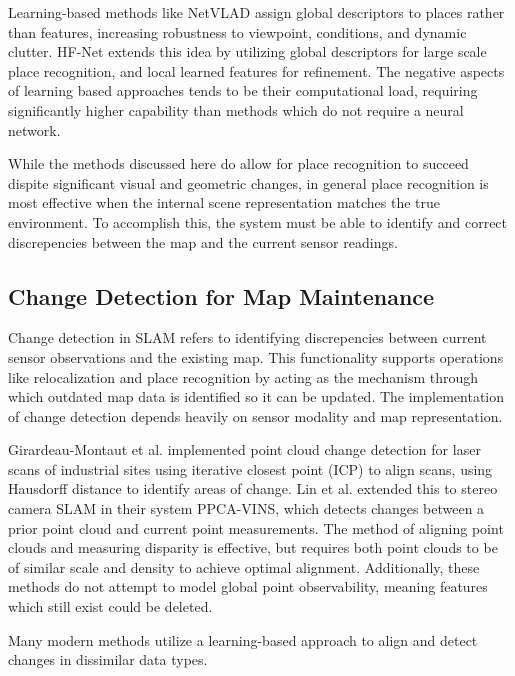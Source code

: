 Learning-based methods like NetVLAD \cite{arandjelovicNetVLADCNNArchitecture2016} assign global descriptors to places rather than features, increasing robustness to viewpoint, conditions, and dynamic clutter. HF-Net \cite{sarlinCoarseFineRobust2019} extends this idea by utilizing global descriptors for large scale place recognition, and local learned features for refinement. The negative aspects of learning based approaches tends to be their computational load, requiring significantly higher capability than methods which do not require a neural network.

While the methods discussed here do allow for place recognition to succeed dispite significant visual and geometric changes, in general place recognition is most effective when the internal scene representation matches the true environment. To accomplish this, the system must be able to identify and correct discrepencies between the map and the current sensor readings.

\subsection{Change Detection for Map Maintenance}

Change detection in SLAM refers to identifying discrepencies between current sensor observations and the existing map. This functionality supports operations like relocalization and place recognition by acting as the mechanism through which outdated map data is identified so it can be updated. The implementation of change detection depends heavily on sensor modality and map representation.

Girardeau-Montaut et al. \cite{girardeau-montautCHANGEDETECTIONPOINTS2005} implemented point cloud change detection for laser scans of industrial sites using iterative closest point (ICP) \cite{arunLeastSquaresFittingTwo1987}
\cite{beslMethodRegistration3D1992} to align scans, using Hausdorff distance \cite{aspertMESHMeasuringErrors2002} to identify areas of change. Lin et al. \cite{linPointCloudChange2022} extended this to stereo camera SLAM in their system PPCA-VINS, which detects changes between a prior point cloud and current point measurements. The method of aligning point clouds and measuring disparity is effective, but requires both point clouds to be of similar scale and density to achieve optimal alignment. Additionally, these methods do not attempt to model global point observability, meaning features which still exist could be deleted.

Many modern methods utilize a learning-based approach to align and detect changes in dissimilar data types.

